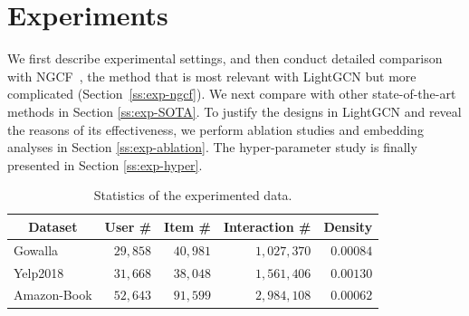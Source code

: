 \section{Experiments}\label{sec:experiments}
We first describe experimental settings, and then conduct detailed comparison with NGCF~\cite{NGCF}, the method that is most relevant with LightGCN but more complicated (Section~\ref{ss:exp-ngcf}). We next compare with other state-of-the-art methods in Section \ref{ss:exp-SOTA}. To justify the designs in LightGCN and reveal the reasons of its effectiveness, we perform ablation studies and embedding analyses in Section \ref{ss:exp-ablation}. The hyper-parameter study is finally presented in Section \ref{ss:exp-hyper}. 

\begin{table}[t]
\caption{Statistics of the experimented data.}
\vspace{-10px}
\label{tab:dataset}
\begin{tabular}{l|r|r|r|r}
\hline
\multicolumn{1}{c|}{\textbf{Dataset}} & \multicolumn{1}{c|}{\textbf{User \#}} & \multicolumn{1}{c|}{\textbf{Item \#}} & \multicolumn{1}{c|}{\textbf{Interaction \#}} & \multicolumn{1}{c}{\textbf{Density}} \\ \hline\hline
Gowalla & $29,858$ & $40,981$ & $1,027,370$ & $0.00084$ \\ \hline
Yelp2018 & $31,668$ & $38,048$ & $1,561,406$ & $0.00130$ \\ \hline
Amazon-Book & $52,643$ & $91,599$ & $2,984,108$ & $0.00062$ \\ \hline
\end{tabular}
\vspace{-15px}
\end{table}

